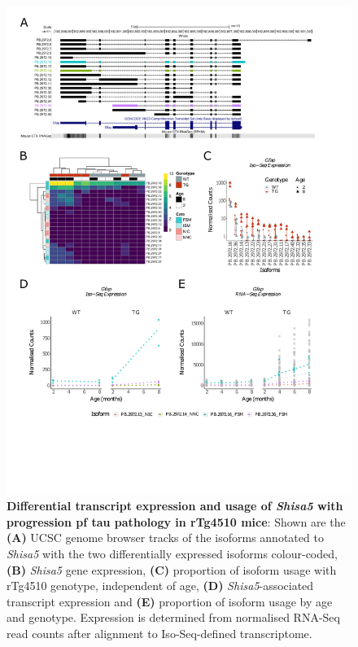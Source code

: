 \begin{figure}[!htp]
	\centering
	\includegraphics[page=5,trim={1.5cm 1.5cm 2cm 1cm}, scale = 0.80]{Figures/Ch5_DiffPlots.pdf}
	\captionsetup{width=0.95\textwidth}
	\caption[Differential \textit{Shisa5} transcript expression and usage]%
	{\textbf{Differential transcript expression and usage of \textit{Shisa5} with progression pf tau pathology in rTg4510 mice}: Shown are the \textbf{(A)} UCSC genome browser tracks of the isoforms annotated to \textit{Shisa5} with the two differentially expressed isoforms colour-coded, \textbf{(B)} \textit{Shisa5} gene expression, \textbf{(C)} proportion of isoform usage with rTg4510 genotype, independent of age, \textbf{(D)} \textit{Shisa5}-associated transcript expression and \textbf{(E)} proportion of isoform usage by age and genotype. Expression is determined from normalised RNA-Seq read counts after alignment to Iso-Seq-defined transcriptome.} 
	\label{fig:DIU_shisa5}
\end{figure}

